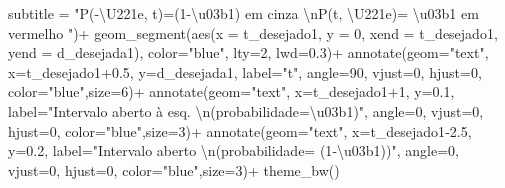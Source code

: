 \documentclass[
]{book}
\newenvironment{Shaded}{\begin{snugshade}}{\end{snugshade}}
\newcommand{\AttributeTok}[1]{\textcolor[rgb]{0.77,0.63,0.00}{#1}}
\newcommand{\DecValTok}[1]{\textcolor[rgb]{0.00,0.00,0.81}{#1}}
\newcommand{\FloatTok}[1]{\textcolor[rgb]{0.00,0.00,0.81}{#1}}
\newcommand{\FunctionTok}[1]{\textcolor[rgb]{0.00,0.00,0.00}{#1}}
\newcommand{\NormalTok}[1]{#1}
\newcommand{\SpecialCharTok}[1]{\textcolor[rgb]{0.00,0.00,0.00}{#1}}
\newcommand{\StringTok}[1]{\textcolor[rgb]{0.31,0.60,0.02}{#1}}
\begin{document}
\begin{Shaded}
\begin{Highlighting}[]
       \AttributeTok{subtitle =} \StringTok{"P({-}\textbackslash{}U221e, t)=(1{-}\textbackslash{}u03b1) em cinza }\SpecialCharTok{\textbackslash{}n}\StringTok{P(t, \textbackslash{}U221e)= \textbackslash{}u03b1 em vermelho "}\NormalTok{)}\SpecialCharTok{+}
  \FunctionTok{geom\_segment}\NormalTok{(}\FunctionTok{aes}\NormalTok{(}\AttributeTok{x =}\NormalTok{ t\_desejado1, }\AttributeTok{y =} \DecValTok{0}\NormalTok{, }\AttributeTok{xend =}\NormalTok{ t\_desejado1, }\AttributeTok{yend =}\NormalTok{ d\_desejada1), }\AttributeTok{color=}\StringTok{"blue"}\NormalTok{, }\AttributeTok{lty=}\DecValTok{2}\NormalTok{, }\AttributeTok{lwd=}\FloatTok{0.3}\NormalTok{)}\SpecialCharTok{+}
  \FunctionTok{annotate}\NormalTok{(}\AttributeTok{geom=}\StringTok{"text"}\NormalTok{, }\AttributeTok{x=}\NormalTok{t\_desejado1}\FloatTok{+0.5}\NormalTok{, }\AttributeTok{y=}\NormalTok{d\_desejada1, }\AttributeTok{label=}\StringTok{"t"}\NormalTok{, }\AttributeTok{angle=}\DecValTok{90}\NormalTok{, }\AttributeTok{vjust=}\DecValTok{0}\NormalTok{, }\AttributeTok{hjust=}\DecValTok{0}\NormalTok{, }\AttributeTok{color=}\StringTok{"blue"}\NormalTok{,}\AttributeTok{size=}\DecValTok{6}\NormalTok{)}\SpecialCharTok{+}
  \FunctionTok{annotate}\NormalTok{(}\AttributeTok{geom=}\StringTok{"text"}\NormalTok{, }\AttributeTok{x=}\NormalTok{t\_desejado1}\SpecialCharTok{+}\DecValTok{1}\NormalTok{, }\AttributeTok{y=}\FloatTok{0.1}\NormalTok{, }\AttributeTok{label=}\StringTok{"Intervalo aberto à esq. }\SpecialCharTok{\textbackslash{}n}\StringTok{(probabilidade=\textbackslash{}u03b1)"}\NormalTok{, }\AttributeTok{angle=}\DecValTok{0}\NormalTok{, }\AttributeTok{vjust=}\DecValTok{0}\NormalTok{, }\AttributeTok{hjust=}\DecValTok{0}\NormalTok{, }\AttributeTok{color=}\StringTok{"blue"}\NormalTok{,}\AttributeTok{size=}\DecValTok{3}\NormalTok{)}\SpecialCharTok{+}
  \FunctionTok{annotate}\NormalTok{(}\AttributeTok{geom=}\StringTok{"text"}\NormalTok{, }\AttributeTok{x=}\NormalTok{t\_desejado1}\FloatTok{{-}2.5}\NormalTok{, }\AttributeTok{y=}\FloatTok{0.2}\NormalTok{, }\AttributeTok{label=}\StringTok{"Intervalo aberto }\SpecialCharTok{\textbackslash{}n}\StringTok{(probabilidade= (1{-}\textbackslash{}u03b1))"}\NormalTok{, }\AttributeTok{angle=}\DecValTok{0}\NormalTok{, }\AttributeTok{vjust=}\DecValTok{0}\NormalTok{, }\AttributeTok{hjust=}\DecValTok{0}\NormalTok{, }\AttributeTok{color=}\StringTok{"blue"}\NormalTok{,}\AttributeTok{size=}\DecValTok{3}\NormalTok{)}\SpecialCharTok{+}  \FunctionTok{theme\_bw}\NormalTok{()}
\end{Highlighting}
\end{Shaded}
\end{document}
